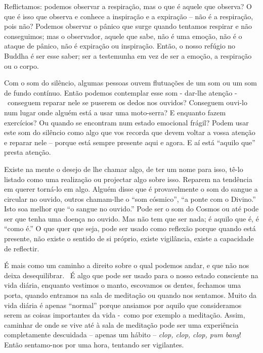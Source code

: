 Reflictamos: podemos observar a respiração, mas o que é aquele que
observa? O que é isso que observa e conhece a inspiração e a expiração
-- não é a respiração, pois não? Podemos observar o pânico que surge
quando tentamos respirar e não conseguimos; mas o observador, aquele que
sabe, não é uma emoção, não é o ataque de pânico, não é expiração ou
inspiração. Então, o nosso refúgio no Buddha é ser esse saber; ser a
testemunha em vez de ser a emoção, a respiração ou o corpo.

Com o som do silêncio, algumas pessoas ouvem flutuações de um som ou um
som de fundo contínuo. Então podemos contemplar esse som - dar-lhe
atenção -~conseguem reparar nele se puserem os dedos nos ouvidos?
Conseguem ouvi-lo num lugar onde alguém está a usar uma moto-serra? E
enquanto fazem exercícios? Ou quando se encontram num estado emocional
frágil? Podem usar este som do silêncio como algo que vos recorda que
devem voltar a vossa atenção e reparar nele -- porque está sempre
presente aqui e agora. E aí está ``aquilo que'' presta atenção.

Existe na mente o desejo de lhe chamar algo, de ter um nome para isso,
tê-lo listado como uma realização ou projectar algo sobre isso. Reparem
na tendência em querer torná-lo em algo. Alguém disse que é
provavelmente o som do sangue a circular no ouvido, outros chamam-lhe o
``som cósmico'', ``a ponte com o Divino.'' Isto soa melhor que ``o
sangue no ouvido.'' Pode ser o som do Cosmos ou até pode ser que tenha
uma doença no ouvido. Mas não tem que ser nada; é aquilo que é, é ``como
é.'' O que quer que seja, pode ser usado como reflexão porque quando
está presente, não existe o sentido de si próprio, existe vigilância,
existe a capacidade de reflectir. ~~

É mais como um caminho a direito sobre o qual podemos andar, e que não
nos deixa desequilibrar. ~É algo que pode ser usado para o nosso estado
consciente na vida diária, enquanto vestimos o manto, escovamos os
dentes, fechamos uma porta, quando entramos na sala de meditação ou
quando nos sentamos. Muito da vida diária é apenas ``normal'' porque
ansiamos por aquilo que consideramos serem as coisas importantes da vida
-~como por exemplo a meditação. Assim, caminhar de onde se vive até à
sala de meditação pode ser uma experiência completamente descuidada --
apenas um hábito -- \emph{clop, clop, clop, pum bang}! Então sentamo-nos
por uma hora, tentando ser vigilantes.

